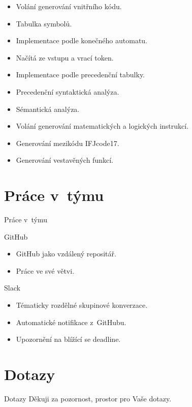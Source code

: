 \documentclass[11pt, hyperref={unicode}]{beamer}
\begin{document}
\begin{frame}
\begin{overprint}
\begin{itemize}
		\item Volání generování vnitřního kódu.
		\item Tabulka symbolů.
	\end{itemize}
    \begin{itemize}
		\item Implementace podle konečného automatu.
		\item Načítá ze vstupu a vrací token.
	\end{itemize}
    \begin{itemize}
    	\item Implementace podle precedenční tabulky.
		\item Precedenční syntaktická analýza.
		\item Sémantická analýza.
		\item Volání generování matematických a logických instrukcí.
	\end{itemize}
    \begin{itemize}
		\item Generování mezikódu IFJcode17.
		\item Generování vestavěných funkcí.
	\end{itemize}
\end{overprint}

\end{frame}

\section{Práce v~týmu}

\begin{frame}{Práce v~týmu}
	\begin{alertblock}{GitHub}
		\begin{itemize}
			\item GitHub jako vzdálený repositář.
			\item Práce ve své větvi.
		\end{itemize}
	\end{alertblock}
	\begin{alertblock}{Slack}
		\begin{itemize}
			\item Tématicky rozdělné skupinové konverzace.
			\item Automatické notifikace z~GitHubu.
			\item Upozornění na blížící se deadline.
		\end{itemize}
	\end{alertblock}
	
\end{frame}

\section{Dotazy}

\begin{frame}{Dotazy}
	\vspace{-5cm}
	\Large{Děkuji za pozornost, prostor pro Vaše dotazy.}
\end{frame}
\end{document}
